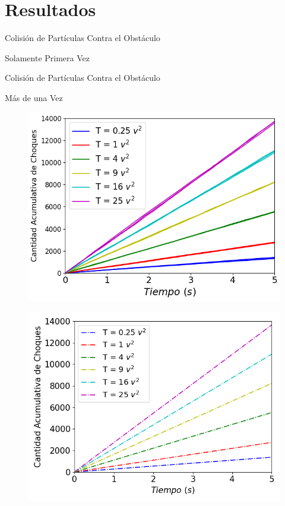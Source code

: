 \section{Resultados}

\begin{frame}{Colisión de Partículas Contra el Obstáculo}
    \begin{block}{Solamente Primera Vez}

    \end{block}
\end{frame}


\begin{frame}{Colisión de Partículas Contra el Obstáculo}
    \begin{block}{Más de una Vez}

    \end{block}

    \begin{multicols}{2}
        {
            \begin{figure}[H]
                \centering
                \includegraphics[width=0.8\linewidth]{pic/ejer3/b3Tiradas.png}
                \label{fig:conway2d:size:i10}
            \end{figure}
        }


        {
            \begin{figure}[H]
                \centering
                \includegraphics[width=0.8\linewidth]{pic/ejer3/bSoloSlopes.png}
                \label{fig:conway2d:size:i90}
            \end{figure}
        }
    \end{multicols}


\end{frame}
